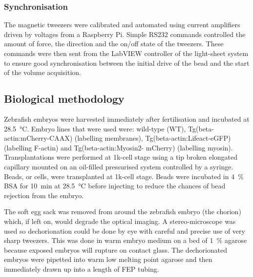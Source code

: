 \subsubsection{Synchronisation}

The magnetic tweezers were calibrated and automated using current amplifiers driven by voltages from a Raspberry Pi.
Simple \gls{RS232} commands controlled the amount of force, the direction and the on/off state of the tweezers.
These commands were then sent from the \gls{LabVIEW} controller of the \gls{light-sheet} system to ensure good synchronisation between the initial drive of the bead and the start of the volume acquisition.
%

\subsection{Biological methodology}

Zebrafish embryos were harvested immediately after fertilisation and incubated at \SI{28.5}{\celsius}.
Embryo lines that were used were: wild-type (WT), Tg(beta-actin:mCherry-CAAX) (labelling membranes), Tg(beta-actin:Lifeact-eGFP) (labelling F-actin) and Tg(beta-actin:Myosin2- mCherry) (labelling myosin).
Transplantations were performed at 1k-cell stage using a tip broken elongated capillary mounted on an oil-filled pressurised system controlled by a syringe.
Beads, or cells, were transplanted at 1k-cell stage.
Beads were incubated in \SI{4}{\percent} BSA for \SI{10}{\minute} at \SI{28.5}{\celsius} before injecting to reduce the chances of bead rejection from the embryo.

The soft egg sack was removed from around the \gls{zebrafish} embryo (the chorion) which, if left on, would degrade the optical imaging.
A stereo-microscope was used so dechorionation could be done by eye with careful and precise use of very sharp tweezers.
This was done in warm embryo medium on a bed of \SI{1}{\percent} agarose because exposed embryos will rupture on contact glass.
The dechorionated embryos were pipetted into warm low melting point agarose and then immediately drawn up into a length of \gls{FEP} tubing.


